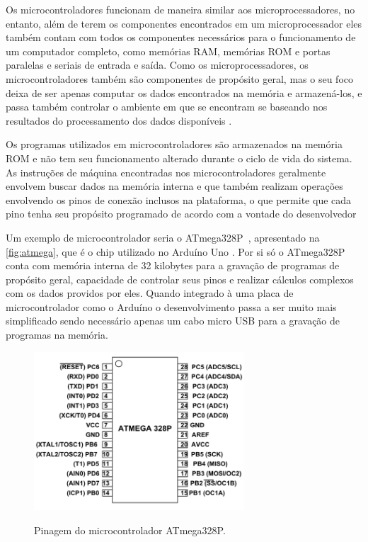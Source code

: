 Os microcontroladores funcionam de maneira similar aos microprocessadores, no entanto, além de terem os componentes encontrados em um microprocessador eles também contam com todos os componentes necessários para o funcionamento de um computador completo, como memórias RAM, memórias ROM e portas paralelas e seriais de entrada e saída. Como os microprocessadores, os microcontroladores também são componentes de propósito geral, mas o seu foco deixa de ser apenas computar os dados encontrados na memória e armazená-los, e passa também controlar o ambiente em que se encontram se baseando nos resultados do processamento dos dados disponíveis \cite{ayala:1991}.

Os programas utilizados em microcontroladores são armazenados na memória ROM e não tem seu funcionamento alterado durante o ciclo de vida do sistema. As instruções de máquina encontradas nos microcontroladores geralmente envolvem buscar dados na memória interna e que também realizam operações envolvendo os pinos de conexão inclusos na plataforma, o que permite que cada pino tenha seu propósito programado de acordo com a vontade do desenvolvedor \cite{ayala:1991}


Um exemplo de microcontrolador seria o ATmega328P~\cite{atmel}, apresentado na \autoref{fig:atmega},  que é o chip utilizado no Arduíno Uno \cite{arduino}. Por si só o ATmega328P conta com memória interna de 32 kilobytes para a gravação de programas de propósito geral, capacidade de controlar seus pinos e realizar cálculos complexos com os dados providos por eles. Quando integrado à uma placa de microcontrolador como o Arduíno o desenvolvimento passa a ser muito mais simplificado sendo necessário apenas um cabo micro USB para a gravação de programas na memória.

\begin{figure}[ht]
    \centering
     \caption{Pinagem do microcontrolador ATmega328P.}
    \includegraphics[width=0.7\textwidth, keepaspectratio]{resources/ATMega328P-Pinout.png}
    \label{fig:atmega}
\end{figure}

